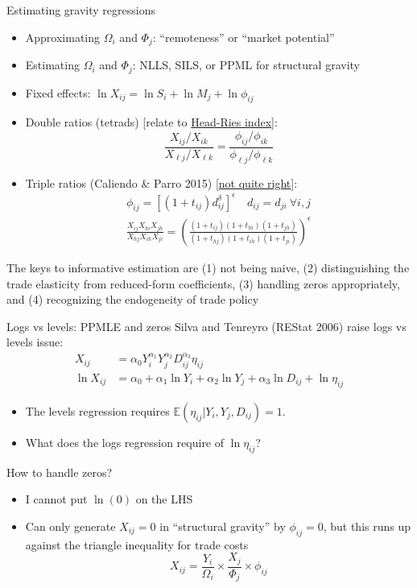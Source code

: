 \documentclass[10pt,notes=hide]{beamer}
\begin{document}
\begin{frame}{Estimating gravity regressions}
\begin{itemize}
	\item Approximating $\Omega_i$ and $\Phi_j$: ``remoteness'' or ``market potential''
	\item Estimating $\Omega_i$ and $\Phi_j$: NLLS, SILS, or PPML for structural gravity
	\item Fixed effects:
	$\ln X_{ij} = \ln S_i + \ln M_j + \ln \phi_{ij}$
	\item Double ratios (tetrads) [relate to \href{http://www-personal.umich.edu/~alandear/glossary/h.html}{Head-Ries index}]:
	\begin{equation*}
	\frac{X_{ij}/X_{ik}}{X_{\ell j}/X_{\ell k}} = \frac{\phi_{ij}/\phi_{ik}}{\phi_{\ell j}/\phi_{\ell k}} 
	\end{equation*}
	\item Triple ratios (Caliendo \& Parro 2015) [\href{https://tradediversion.net/2020/04/26/do-customs-duties-compound-non-tariff-trade-costs-not-in-the-us/}{not quite right}]:
	\begin{align*}
	\phi_{ij} = [(1+t_{ij})d_{ij}^\delta]^{\epsilon} \quad d_{ij}=d_{ji} \ \forall  i,j \\
	\frac{X_{ij}X_{hi}X_{jh}}{X_{hj}X_{ih}X_{ji}}
	=
	\left(
	\frac{(1+t_{ij})(1+t_{hi})(1+t_{jh})}{(1+t_{hj})(1+t_{ih})(1+t_{ji})} 
	\right)^{\epsilon}
	\end{align*}
\end{itemize}
The keys to informative estimation are (1) not being naive, (2) distinguishing the trade elasticity from reduced-form coefficients, (3) handling zeros appropriately, and (4) recognizing the endogeneity of trade policy
\end{frame}
\begin{frame}{Logs vs levels: PPMLE and zeros}
Silva and Tenreyro (REStat 2006) raise logs vs levels issue:
\begin{align*}
X_{ij} &= \alpha_0 Y_i^{\alpha_1}  Y_j^{\alpha_2}  D_{ij}^{\alpha_3} \eta_{ij}
\\
\ln X_{ij} &= \alpha_0 +{\alpha_1} \ln  Y_i   +{\alpha_2}\ln  Y_j +{\alpha_3} \ln D_{ij} + \ln \eta_{ij}
\end{align*}
\vspace{-8mm}
\begin{itemize}
	\item The levels regression requires $\mathbb{E}\left(\eta_{ij}|Y_i,Y_j,D_{ij}\right)=1$.
	\item What does the logs regression require of $\ln \eta_{ij}$?
\end{itemize}
How to handle zeros?
\begin{itemize}
	\item I cannot put $\ln(0)$ on the LHS
	\item Can only generate $X_{ij}=0$ in ``structural gravity'' by $\phi_{ij} = 0$, but this runs up against the triangle inequality for trade costs
\begin{equation*}
X_{ij} = {\frac{Y_i}{\Omega_i}} \times {\frac{X_j}{\Phi_j}} \times \phi_{ij}
\end{equation*}
\end{itemize}
\end{frame}
\end{document}

